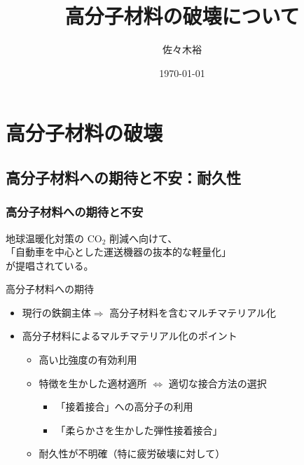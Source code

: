 \documentclass[11pt, dvipdfmx]{beamer}
\title
[高分子材料の破壊について]
{高分子材料の破壊について}
\author[佐々木]{佐々木裕}
\date{\today}
\begin{document}
\begin{frame}\frametitle{}
	\titlepage
\end{frame}

\section{高分子材料の破壊}
\subsection{高分子材料への期待と不安：耐久性}
\begin{frame}
\frametitle{高分子材料への期待と不安}
{\Large
地球温暖化対策の CO$_2$ 削減へ向けて、\\
{\color{red}「自動車を中心とした運送機器の抜本的な軽量化」}
\\
が提唱されている。}

\begin{block}{高分子材料への期待}
	\begin{itemize}
	\item
	現行の鉄鋼主体$ \Rightarrow$ 高分子材料を含むマルチマテリアル化
	
	\item
	高分子材料によるマルチマテリアル化のポイント
		\begin{itemize}
		\item
		高い比強度の有効利用
		\item
		特徴を生かした適材適所 $\Leftrightarrow$ 適切な接合方法の選択
			\begin{itemize}
			\large
			\item
			{\color{red} 「接着接合」への高分子の利用}
			\item
			{\color{red} 「柔らかさを生かした弾性接着接合」}
			\end{itemize}
		\Large
		\item
		{\color{blue}耐久性が不明確（特に疲労破壊に対して）}
		\end{itemize}
	\end{itemize}
\end{block}
\normalsize
\end{frame}

\end{document}
